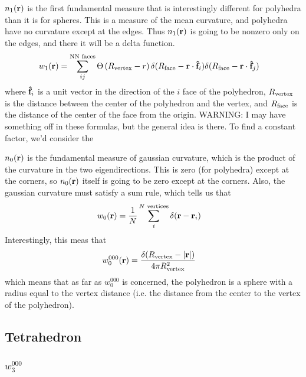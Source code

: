 \documentclass[letterpaper,twocolumn,amsmath,amssymb,pre]{revtex4-1}
\begin{document}
$n_1(\mathbf{r})$ is the first fundamental measure that is interestingly
different for polyhedra than it is for spheres.  This is a measure of
the mean curvature, and polyhedra have no curvature except at the
edges.  Thus $n_1(\mathbf{r})$ is going to be nonzero only on the edges, and
there it will be a delta function.
\begin{align}\label{eq:w1}
  w_1(\mathbf{r}) &= \sum_{ij}^{\text{NN faces}}
  \Theta\left(R_{\text{vertex}} - r\right)
  \delta(R_{\text{face}} - \mathbf{r}\cdot \mathbf{\hat{f}}_i)
  \delta(R_{\text{face}} - \mathbf{r}\cdot \mathbf{\hat{f}}_j)
\end{align}
where $\mathbf{\hat{f}}_i$ is a unit vector in the direction of the $i$ face
of the polyhedron, $R_{\text{vertex}}$ is the distance between the center of
the polyhedron and the vertex, and $R_{\text{face}}$ is the distance of the
center of the face from the origin.  WARNING: I may have something off
in these formulas, but the general idea is there.  To find a constant
factor, we'd consider the


$n_0(\mathbf{r})$ is the fundamental measure of gaussian curvature, which is
the product of the curvature in the two eigendirections.  This is zero
(for polyhedra) except at the corners, so $n_0(\mathbf{r})$ itself is going
to be zero except at the corners.  Also, the gaussian curvature
must satisfy a sum rule, which tells us that
\begin{align}
  w_0(\mathbf{r}) &= \frac1{N}\sum_{i}^{N\text{ vertices}} \delta(\mathbf{r}-\mathbf{r}_i)
\end{align}
Interestingly, this meas that
\begin{align}
  w_0^{000}(\mathbf{r}) &= \frac{\delta(R_{\text{vertex}} - |\mathbf{r}|)}{4\pi R_{\text{vertex}}^2}
\end{align}
which means that as far as $w_0^{000}$ is concerned, the polyhedron is a
sphere with a radius equal to the vertex distance (i.e. the distance
from the center to the vertex of the polyhedron).

\subsection{Tetrahedron}

\subsubsection{$w_3^{000}$}
\end{document}
